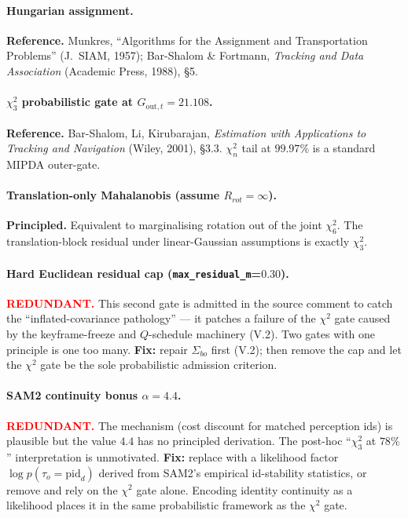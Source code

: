 \documentclass[11pt]{article}
\newcommand{\REDUNDANT}{\textcolor{red}{\textbf{REDUNDANT.}}}
\newcommand{\REFERENCE}{\textbf{Reference.}}
\newcommand{\PRINCIPLED}{\textbf{Principled.}}
\begin{document}
\paragraph{Hungarian assignment.}
\REFERENCE{} Munkres, ``Algorithms for the Assignment and
Transportation Problems'' (J.~SIAM, 1957); Bar-Shalom \& Fortmann,
\emph{Tracking and Data Association} (Academic Press, 1988), \S 5.

\paragraph{$\chi^2_3$ probabilistic gate at $G_{\text{out},t}=21.108$.}
\REFERENCE{} Bar-Shalom, Li, Kirubarajan, \emph{Estimation with
Applications to Tracking and Navigation} (Wiley, 2001), \S 3.3.
$\chi^2_n$ tail at $99.97\%$ is a standard MIPDA outer-gate.

\paragraph{Translation-only Mahalanobis (assume $R_{rot}=\infty$).}
\PRINCIPLED{} Equivalent to marginalising rotation out of the joint
$\chi^2_6$. The translation-block residual under linear-Gaussian
assumptions is exactly $\chi^2_3$.

\paragraph{Hard Euclidean residual cap (\texttt{max\_residual\_m}=$0.30$).}
\REDUNDANT{} This second gate is admitted in the source comment to
catch the ``inflated-covariance pathology'' --- it patches a failure
of the $\chi^2$ gate caused by the keyframe-freeze and $Q$-schedule
machinery (V.2). Two gates with one principle is one too many.
\textbf{Fix:} repair $\Sigma_{bo}$ first (V.2); then remove the cap and
let the $\chi^2$ gate be the sole probabilistic admission criterion.

\paragraph{SAM2 continuity bonus $\alpha=4.4$.}
\REDUNDANT{} The mechanism (cost discount for matched perception ids)
is plausible but the value $4.4$ has no principled derivation. The
post-hoc ``$\chi^2_3$ at $78\%$'' interpretation is unmotivated.
\textbf{Fix:} replace with a likelihood factor
$\log p(\tau_o=\mathrm{pid}_d)$ derived from SAM2's empirical
id-stability statistics, or remove and rely on the $\chi^2$ gate
alone. Encoding identity continuity as a likelihood places it in the
same probabilistic framework as the $\chi^2$ gate.
\end{document}
